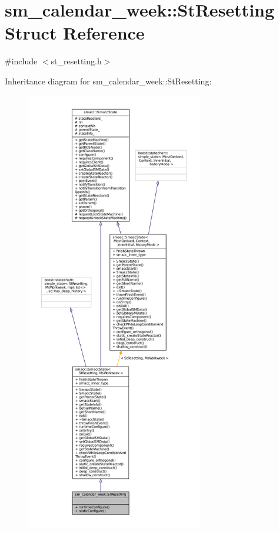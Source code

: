 \hypertarget{structsm__calendar__week_1_1StResetting}{}\section{sm\+\_\+calendar\+\_\+week\+:\+:St\+Resetting Struct Reference}
\label{structsm__calendar__week_1_1StResetting}


{\ttfamily \#include $<$st\+\_\+resetting.\+h$>$}



Inheritance diagram for sm\+\_\+calendar\+\_\+week\+:\+:St\+Resetting\+:
\nopagebreak
\begin{figure}[H]
\begin{center}
\leavevmode
\includegraphics[height=550pt]{structsm__calendar__week_1_1StResetting__inherit__graph}
\end{center}
\end{figure}


